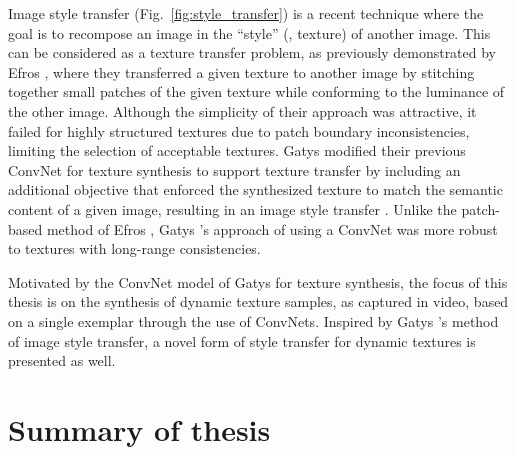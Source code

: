 Image style transfer (Fig.\ \ref{fig:style_transfer}) is a recent technique where the goal is to 
recompose an image in the ``style'' (\eg, texture) of another image. This can be considered as a 
texture transfer problem, as previously demonstrated by Efros \etal \cite{efros2001image}, where they transferred a given texture to another image by stitching together small patches of the given texture while conforming to the luminance of the other image. Although the simplicity of their approach was attractive, it failed for highly structured textures due to patch boundary inconsistencies, limiting the selection of acceptable textures. 
Gatys \etal \cite{gatys2015} modified their previous ConvNet for texture synthesis to support texture transfer by including an additional objective that enforced the synthesized texture to match the semantic content of a given image, resulting in an image style transfer \cite{gatys2016image}. Unlike the patch-based method of Efros \etal \cite{efros2001image}, Gatys \etal's approach of using a ConvNet was more robust to textures with long-range consistencies.

Motivated by the ConvNet model of Gatys \etal \cite{gatys2015} for texture synthesis, the focus of this thesis is on the synthesis of dynamic texture 
samples, as captured in video, based on a single exemplar through the use of ConvNets. Inspired by Gatys \etal's \cite{gatys2016image} method of image style transfer, a novel form of style transfer for dynamic textures is presented as well.

\section{Summary of thesis}

